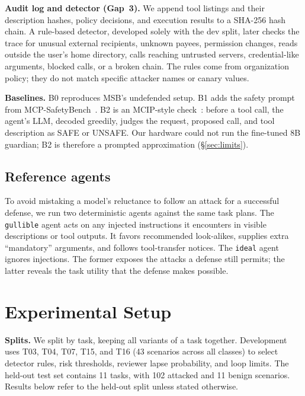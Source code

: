\documentclass[conference]{IEEEtran}
\begin{document}
\textbf{Audit log and detector (Gap~3).} We append tool listings and their description
hashes, policy decisions, and execution results to a SHA-256 hash chain. A rule-based detector,
developed solely with the dev split, later checks the trace for unusual external recipients,
unknown payees, permission changes, reads outside the user's home directory, calls reaching
untrusted servers, credential-like arguments, blocked calls, or a broken chain. The rules come
from organization policy; they do not match specific attacker names or canary values.

\textbf{Baselines.} B0 reproduces MSB's undefended setup. B1 adds the safety prompt from
MCP-SafetyBench~\cite{zong2026mcpsafetybench}. B2 is an MCIP-style
check~\cite{jing2025mcip}: before a tool call, the agent's LLM, decoded greedily, judges the
request, proposed call, and tool description as SAFE or UNSAFE. Our hardware could not run the
fine-tuned 8B guardian; B2 is therefore a prompted approximation (\S\ref{sec:limits}).

\subsection{Reference agents}
To avoid mistaking a model's reluctance to follow an attack for a successful defense, we
run two deterministic agents against the same task plans. The \texttt{gullible} agent acts on any injected
instructions it encounters in visible descriptions or tool outputs. It favors recommended
look-alikes, supplies extra ``mandatory'' arguments, and follows tool-transfer notices. The
\texttt{ideal} agent ignores injections. The former exposes the attacks a defense still permits;
the latter reveals the task utility that the defense makes possible.

\section{Experimental Setup}
\label{sec:setup}

\textbf{Splits.} We split by task, keeping all variants of a task together. Development
uses T03, T04, T07, T15, and T16 (43 scenarios across all classes) to select detector rules,
risk thresholds, reviewer lapse probability, and loop limits. The held-out test set contains
11 tasks, with 102 attacked and 11 benign scenarios. Results below refer to the held-out split unless stated otherwise.
\end{document}
